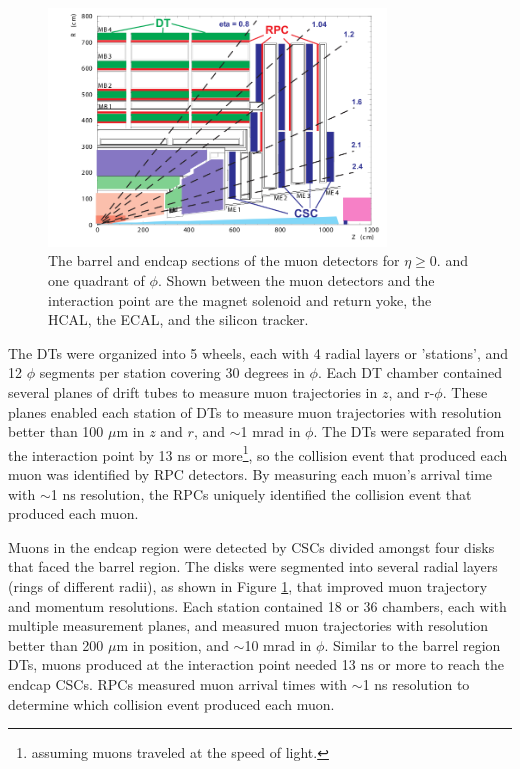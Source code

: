 \begin{figure}[ht]
	\centering
	\includegraphics[width=0.8\textwidth]{figures/muonDetectorLayout.png}
	\caption{The barrel and endcap sections of the muon detectors for $\eta \geq 0.$ and one quadrant of $\phi$.  Shown 
		between the muon detectors and the interaction point are the magnet solenoid and return yoke, the HCAL, the ECAL, 
		and the silicon tracker.}
	\label{fig:muonBarrelAndEndcapDetectors}
\end{figure}


The DTs were organized into 5 wheels, each with 4 radial layers or 'stations', and 12 $\phi$ segments per 
station covering 30 degrees in $\phi$.  Each DT chamber contained several planes of drift tubes to measure 
muon trajectories in $z$, and r-$\phi$.  These planes enabled each station of DTs to measure muon trajectories 
with resolution better than 100 $\mu$m in $z$ and $r$, and $\sim$1 mrad in $\phi$.  The DTs were separated 
from the interaction point by 13 ns or more\footnote{assuming muons traveled at the speed 
of light.}, so the collision event that produced each muon was identified by RPC detectors.  By measuring 
each muon's arrival time with $\sim$1 ns resolution, the RPCs uniquely identified the collision event that 
produced each muon.

Muons in the endcap region were detected by CSCs divided amongst four disks that faced the barrel region.  
The disks were segmented into several radial layers (rings of different radii), as shown in Figure \ref{fig:muonBarrelAndEndcapDetectors}, 
that improved muon trajectory and momentum resolutions.  Each station contained 18 or 36 
chambers, each with multiple measurement planes, and measured muon trajectories with resolution 
better than 200 $\mu$m in position, and $\sim$10 mrad in $\phi$.  Similar to the barrel region DTs, muons produced 
at the interaction point needed 13 ns or more to reach the endcap CSCs.  RPCs measured muon arrival times with $\sim$1 
ns resolution to determine which collision event produced each muon.

